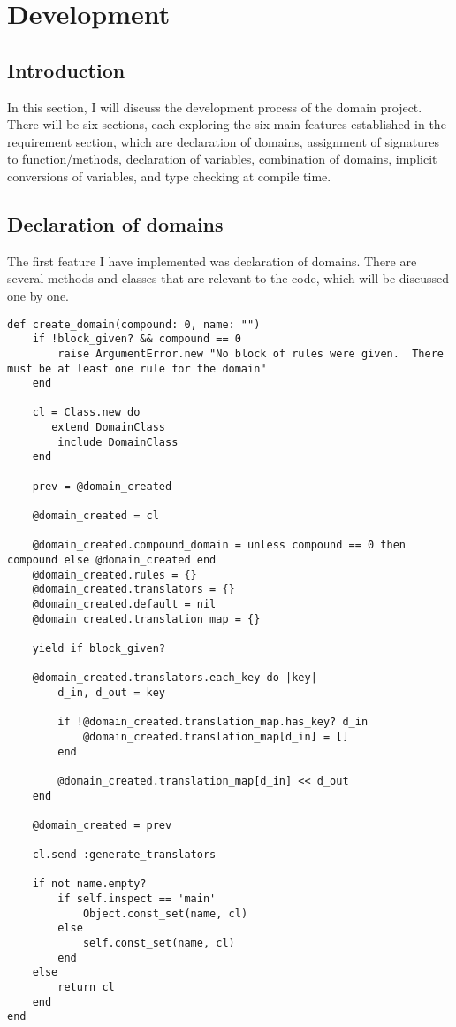 \section{Development}

\subsection{Introduction}
In this section, I will discuss the development process of the domain project.  There will be six sections, each exploring the six main features established in the requirement section, which are declaration of domains, assignment of signatures to function/methods, declaration of variables, combination of domains, implicit conversions of variables, and type checking at compile time. 

\subsection{Declaration of domains}
The first feature  I have implemented was declaration of domains.  There are several methods and classes that are relevant to the code, which will be discussed one by one.  
\begin{lstlisting}[caption={Method for creating domains}]
def create_domain(compound: 0, name: "")
    if !block_given? && compound == 0
        raise ArgumentError.new "No block of rules were given.  There must be at least one rule for the domain"
    end

    cl = Class.new do
       extend DomainClass   
        include DomainClass
    end

    prev = @domain_created

    @domain_created = cl

    @domain_created.compound_domain = unless compound == 0 then compound else @domain_created end
    @domain_created.rules = {}
    @domain_created.translators = {}
    @domain_created.default = nil
    @domain_created.translation_map = {}

    yield if block_given?
        
    @domain_created.translators.each_key do |key|
        d_in, d_out = key

        if !@domain_created.translation_map.has_key? d_in
            @domain_created.translation_map[d_in] = []
        end

        @domain_created.translation_map[d_in] << d_out
    end

    @domain_created = prev

    cl.send :generate_translators

    if not name.empty?
        if self.inspect == 'main'
            Object.const_set(name, cl)
        else
            self.const_set(name, cl)
        end
    else
        return cl
    end
end
\end{lstlisting}

